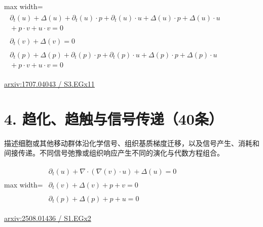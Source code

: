 \documentclass[UTF8,10pt,a4paper,fontset=mac]{ctexart}
\begin{document}
\begin{minipage}{\linewidth}\begin{center}\begin{adjustbox}{max width=\linewidth}$\displaystyle\begin{gathered}\begin{gathered}\partial_{t}(u)+\Delta(u)+\partial_{t}(u)\cdot p+\partial_{t}(u)\cdot u+\Delta(u)\cdot p+\Delta(u)\cdot u\\[-1pt]{}+p\cdot v+u\cdot v=0\end{gathered}\\[5pt]\begin{gathered}\partial_{t}(v)+\Delta(v)=0\end{gathered}\\[5pt]\begin{gathered}\partial_{t}(p)+\Delta(p)+\partial_{t}(p)\cdot p+\partial_{t}(p)\cdot u+\Delta(p)\cdot p+\Delta(p)\cdot u\\[-1pt]{}+p\cdot v+u\cdot v=0\end{gathered}\end{gathered}$\end{adjustbox}\end{center}{\small\href{https://arxiv.org/html/1707.04043#S3.EGx11}{arxiv:1707.04043 / S3.EGx11}}\par\end{minipage}\par\vspace{6mm}

\section*{4. 趋化、趋触与信号传递（40条）}
描述细胞或其他移动群体沿化学信号、组织基质梯度迁移，以及信号产生、消耗和间接传递。不同信号弛豫或组织响应产生不同的演化与代数方程组合。\par\medskip

\begin{minipage}{\linewidth}\begin{center}\begin{adjustbox}{max width=\linewidth}$\displaystyle\begin{gathered}\begin{gathered}\partial_{t}(u)+\nabla\cdot(\nabla(v)\cdot u)+\Delta(u)=0\end{gathered}\\[5pt]\begin{gathered}\partial_{t}(v)+\Delta(v)+p+v=0\end{gathered}\\[5pt]\begin{gathered}\partial_{t}(p)+\Delta(p)+p+u=0\end{gathered}\end{gathered}$\end{adjustbox}\end{center}{\small\href{https://arxiv.org/html/2508.01436#S1.EGx2}{arxiv:2508.01436 / S1.EGx2}}\par\end{minipage}\par\vspace{6mm}
\end{document}
